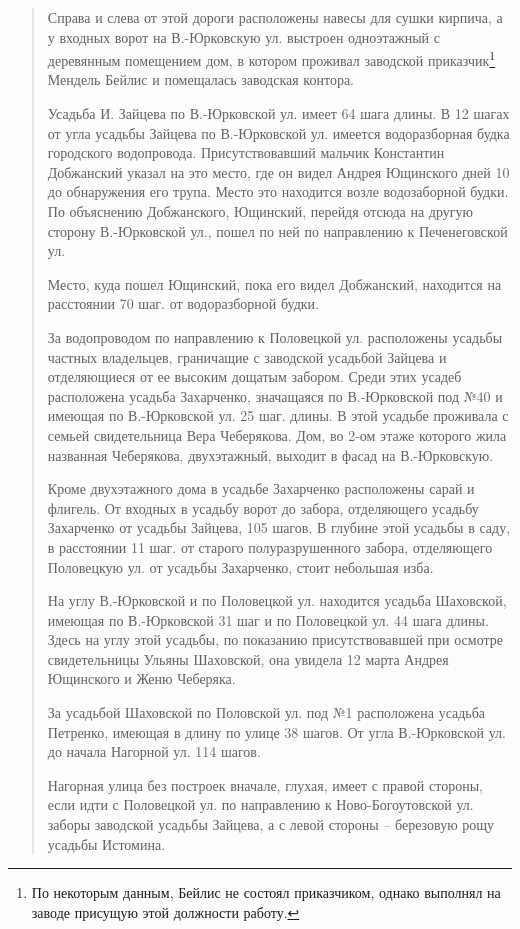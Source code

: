 \begin{quotation}
Справа и слева от этой дороги расположены навесы для сушки кирпича, а у входных ворот на В.-Юрко\-вскую ул. выстроен одноэтажный с деревянным помещением дом, в котором проживал заводской приказчик\footnote{По некоторым данным, Бейлис не состоял приказчиком, однако выполнял на заводе присущую этой должности работу.} Мендель Бейлис и помещалась заводская контора.

Усадьба И. Зайцева по В.-Юрковской ул. имеет 64 шага длины. В 12 шагах от угла усадьбы Зайцева по В.-Юрковской ул. имеется водоразборная будка городского водопровода. Присутствовавший мальчик Константин Добжанский указал на это место, где он видел Андрея Ющинского дней 10 до обнаружения его трупа. Место это находится возле водозаборной будки. По объяснению Добжанского, Ющинский, перейдя отсюда на другую сторону В.-Юрков\-ской ул., пошел по ней по направлению к Печенеговской ул. 

Место, куда пошел Ющинский, пока его видел Добжанский, находится на расстоянии 70 шаг. от водоразборной будки.

За водопроводом по направлению к Половецкой ул. расположены усадьбы частных владельцев, граничащие с заводской усадьбой Зайцева и отделяющиеся от ее высоким дощатым забором. Среди этих усадеб расположена усадьба Захарченко, значащаяся по В.-Юрковской под №40 и имеющая по В.-Юрко\-вской ул. 25 шаг. длины. В этой усадьбе проживала с семьей свидетельница Вера Чеберякова. Дом, во 2-ом этаже которого жила названная Чеберякова, двухэтажный, выходит в фасад на В.-Юрковс\-кую.

Кроме двухэтажного дома в усадьбе Захарченко расположены сарай и флигель. От входных в усадьбу ворот до забора, отделяющего усадьбу Захарченко от усадьбы Зайцева, 105 шагов. В глубине этой усадьбы в саду, в расстоянии 11 шаг. от старого полуразрушенного забора, отделяющего Половецкую ул. от усадьбы Захарченко, стоит небольшая изба. 

На углу В.-Юрковской и по Половецкой ул. находится усадьба Шаховской, имеющая по В.-Юрковской 31 шаг и по Половецкой ул. 44 шага длины. Здесь на углу этой усадьбы, по показанию присутствовавшей при осмотре свидетельницы Ульяны Шаховской, она увидела 12 марта Андрея Ющинского и Женю Чеберяка.

За усадьбой Шаховской по Половской ул. под №1 расположена усадьба Петренко, имеющая в длину по улице 38 шагов. От угла В.-Юр\-ковской ул. до начала Нагорной ул. 114 шагов.

Нагорная улица без построек вначале, глухая, имеет с правой стороны, если идти с Половецкой ул. по направлению к Ново-Богоутовс\-кой ул. заборы заводской усадьбы Зайцева, а с левой стороны – березовую рощу усадьбы Истомина.


\end{quotation}
